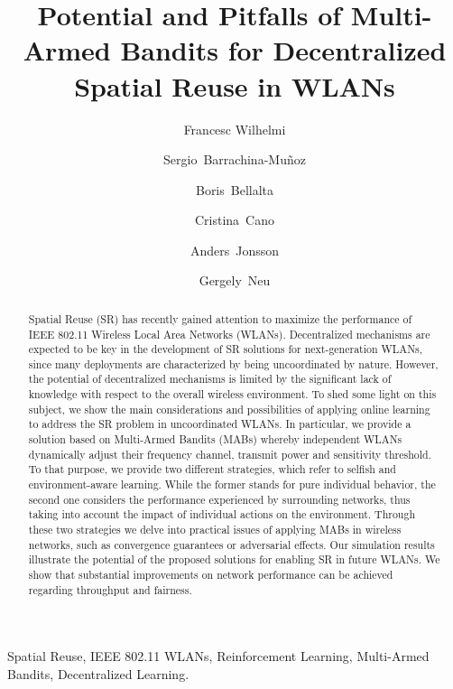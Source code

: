 \documentclass[preprint,12pt]{elsarticle}
\begin{document}
\begin{frontmatter}

\title{Potential and Pitfalls of Multi-Armed Bandits for Decentralized Spatial Reuse in WLANs}

\author[label1]{Francesc Wilhelmi } %
\author[label1]{Sergio~Barrachina-Mu\~noz}
\author[label1]{Boris~Bellalta} \author[label2]{Cristina~Cano}
\author[label3]{Anders~Jonsson}
\author[label3]{Gergely~Neu}
\address[label1]{Wireless Networking Research Group (WN-UPF), 08002 Barcelona, Spain}
\address[label2]{Wireless Networks Research Group (WINE-UOC), 08860 Castelldefels (Barelona), Spain}
\address[label3]{Artificial Intelligence and Machine Learning Research Group (AIML-UPF), 08002 Barcelona, Spain}

\begin{abstract}
Spatial Reuse (SR) has recently gained attention to maximize the performance of IEEE 802.11 Wireless Local Area Networks (WLANs). Decentralized mechanisms are expected to be key in the development of SR solutions for next-generation WLANs, since many deployments are characterized by being uncoordinated by nature. However, the potential of decentralized mechanisms is limited by the significant lack of knowledge with respect to the overall wireless environment. To shed some light on this subject, we show the main considerations and possibilities of applying online learning to address the SR problem in uncoordinated WLANs. In particular, we provide a solution based on Multi-Armed Bandits (MABs) whereby independent WLANs dynamically adjust their frequency channel, transmit power and sensitivity threshold. To that purpose, we provide two different strategies, which refer to selfish and environment-aware learning. While the former stands for pure individual behavior, the second one considers the performance experienced by surrounding networks, thus taking into account the impact of individual actions on the environment. Through these two strategies we delve into practical issues of applying MABs in wireless networks, such as convergence guarantees or adversarial effects. Our simulation results illustrate the potential of the proposed solutions for enabling SR in future WLANs. We show that substantial improvements on network performance can be achieved regarding throughput and fairness.
\end{abstract}

\begin{keyword}
Spatial Reuse, IEEE 802.11 WLANs, Reinforcement Learning, Multi-Armed Bandits, Decentralized Learning.	
\end{keyword}

\end{frontmatter}
\end{document}
